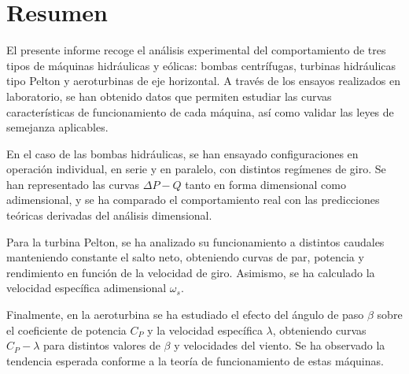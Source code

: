 \documentclass[10pt]{IEEEtran}
\begin{document}
\pagebreak

\section*{Resumen}

El presente informe recoge el análisis experimental del comportamiento de tres tipos de máquinas hidráulicas y eólicas: bombas centrífugas, turbinas hidráulicas tipo Pelton y aeroturbinas de eje horizontal. A través de los ensayos realizados en laboratorio, se han obtenido datos que permiten estudiar las curvas características de funcionamiento de cada máquina, así como validar las leyes de semejanza aplicables.

En el caso de las bombas hidráulicas, se han ensayado configuraciones en operación individual, en serie y en paralelo, con distintos regímenes de giro. Se han representado las curvas $\Delta P - Q$ tanto en forma dimensional como adimensional, y se ha comparado el comportamiento real con las predicciones teóricas derivadas del análisis dimensional.

Para la turbina Pelton, se ha analizado su funcionamiento a distintos caudales manteniendo constante el salto neto, obteniendo curvas de par, potencia y rendimiento en función de la velocidad de giro. Asimismo, se ha calculado la velocidad específica adimensional $\omega_s$.

Finalmente, en la aeroturbina se ha estudiado el efecto del ángulo de paso $\beta$ sobre el coeficiente de potencia $C_P$ y la velocidad específica $\lambda$, obteniendo curvas $C_P - \lambda$ para distintos valores de $\beta$ y velocidades del viento. Se ha observado la tendencia esperada conforme a la teoría de funcionamiento de estas máquinas.


\end{document}
